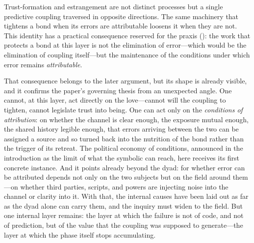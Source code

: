\begin{claim}
Trust-formation and estrangement are not distinct processes but a single predictive coupling traversed in opposite directions. The same machinery that tightens a bond when its errors are attributable loosens it when they are not. This identity has a practical consequence reserved for the praxis (): the work that protects a bond at this layer is not the elimination of error---which would be the elimination of coupling itself---but the maintenance of the conditions under which error remains \emph{attributable}.
\end{claim}

\noindent
That consequence belongs to the later argument, but its shape is already visible, and it confirms the paper's governing thesis from an unexpected angle. One cannot, at this layer, act directly on the love---cannot will the coupling to tighten, cannot legislate trust into being. One can act only on the \emph{conditions of attribution}: on whether the channel is clear enough, the exposure mutual enough, the shared history legible enough, that errors arriving between the two can be assigned a source and so turned back into the nutrition of the bond rather than the trigger of its retreat. The political economy of conditions, announced in the introduction as the limit of what the symbolic can reach, here receives its first concrete instance. And it points already beyond the dyad: for whether error can be attributed depends not only on the two subjects but on the field around them---on whether third parties, scripts, and powers are injecting noise into the channel or clarity into it. With that, the internal causes have been laid out as far as the dyad alone can carry them, and the inquiry must widen to the field. But one internal layer remains: the layer at which the failure is not of code, and not of prediction, but of the value that the coupling was supposed to generate---the layer at which the phase itself stops accumulating.
